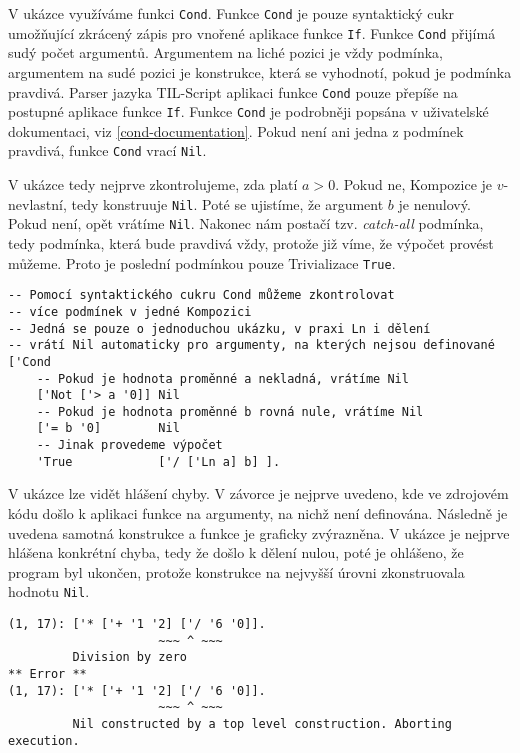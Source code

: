 V ukázce využíváme funkci \lstinline{Cond}. Funkce \lstinline{Cond} je pouze syntaktický cukr
umožňující zkrácený zápis pro vnořené aplikace funkce \lstinline{If}. Funkce \lstinline{Cond}
přijímá sudý počet argumentů. Argumentem na liché pozici je vždy podmínka, argumentem na sudé pozici
je konstrukce, která se vyhodnotí, pokud je podmínka pravdivá. Parser jazyka TIL-Script aplikaci
funkce \lstinline{Cond} pouze přepíše na postupné aplikace funkce \lstinline{If}. Funkce
\lstinline{Cond} je podrobněji popsána v uživatelské dokumentaci, viz \ref{cond-documentation}.
Pokud není ani jedna z podmínek pravdivá, funkce \lstinline{Cond} vrací \lstinline{Nil}.

V ukázce tedy nejprve zkontrolujeme, zda platí $a > 0$. Pokud ne, Kompozice je $v$-nevlastní, tedy
konstruuje \lstinline{Nil}. Poté se ujistíme, že argument $b$ je nenulový. Pokud není, opět vrátíme
\lstinline{Nil}. Nakonec nám postačí tzv. \textit{catch-all} podmínka, tedy podmínka, která bude
pravdivá vždy, protože již víme, že výpočet provést můžeme. Proto je poslední podmínkou pouze
Trivializace \lstinline{True}.

\begin{lstlisting}[caption={Příklad využití Nil},label=nil-example]
-- Pomocí syntaktického cukru Cond můžeme zkontrolovat
-- více podmínek v jedné Kompozici
-- Jedná se pouze o jednoduchou ukázku, v praxi Ln i dělení
-- vrátí Nil automaticky pro argumenty, na kterých nejsou definované
['Cond
    -- Pokud je hodnota proměnné a nekladná, vrátíme Nil
    ['Not ['> a '0]] Nil
    -- Pokud je hodnota proměnné b rovná nule, vrátíme Nil
    ['= b '0]        Nil
    -- Jinak provedeme výpočet
    'True            ['/ ['Ln a] b] ].
\end{lstlisting}

V ukázce  lze vidět hlášení chyby. V závorce je nejprve uvedeno,
kde ve zdrojovém kódu došlo k aplikaci funkce na argumenty, na nichž není definována. Následně
je uvedena samotná konstrukce a funkce je graficky zvýrazněna. V ukázce je nejprve hlášena konkrétní
chyba, tedy že došlo k dělení nulou, poté je ohlášeno, že program byl ukončen, protože konstrukce
na nejvyšší úrovni zkonstruovala hodnotu \lstinline{Nil}.

\begin{lstlisting}[caption={Příklad hlášení chyby},label=error-reporting-on-nil]
(1, 17): ['* ['+ '1 '2] ['/ '6 '0]].
                     ~~~ ^ ~~~
         Division by zero
** Error **
(1, 17): ['* ['+ '1 '2] ['/ '6 '0]].
                     ~~~ ^ ~~~
         Nil constructed by a top level construction. Aborting execution.
\end{lstlisting}

